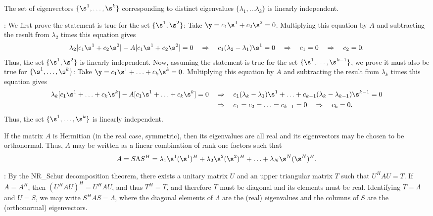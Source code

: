 \begin{fact} \label{fact.A.D.D.A}
The set of eigenvectors $\{\s^{1},\ldots,\s^{k}\}$ corresponding to
distinct eigenvalues $\{\lambda_{1},\ldots\lambda_{k}\}$ is linearly
independent.
\end{fact}

\/: We first prove the statement
is true for the set $\{\s^{1},\s^{2}\}$: Take
$\y=c_{1}\s^{1}+c_{2}\s^{2}=0$.  Multiplying this equation by $A$ and
subtracting the result from $\lambda_{2}$ times this equation gives
\begin{equation*}
    \lambda_{2}[c_{1}\s^{1}+c_{2}\s^{2}] - A[c_{1}\s^{1}+c_{2}\s^{2}] =0 \quad \Rightarrow \quad
    c_{1} (\lambda_{2}-\lambda_{1}) \s^{1} = 0 \quad \Rightarrow \quad c_{1}=0 \quad \Rightarrow \quad c_{2}=0.
\end{equation*}
Thus, the set $\{\s^{1},\s^{2}\}$ is linearly independent.  Now,
assuming the statement is true for the set
$\{\s^{1},\ldots,\s^{k-1}\}$, we prove it must also be true for
$\{\s^{1},\ldots,\s^{k}\}$: Take
$\y=c_{1}\s^{1}+\ldots+c_{k}\s^{k}=0$.  Multiplying this equation by
$A$ and subtracting the result from $\lambda_{k}$ times this equation
gives
\begin{align*}
    \lambda_{k}[c_{1}\s^{1}+\ldots+c_{k}\s^{k}] -
    A[c_{1}\s^{1}+\ldots+c_{k}\s^{k}] =0 \quad &\Rightarrow \quad c_{1}
    (\lambda_{k}-\lambda_{1}) \s^{1} + \ldots + c_{k-1}
    (\lambda_{k}-\lambda_{k-1}) \s^{k-1} = 0 \\ &\Rightarrow \quad
    c_{1}=c_{2}=\ldots=c_{k-1}=0 \quad \Rightarrow \quad c_{k}=0.
\end{align*}
Thus, the set $\{\s^{1},\ldots,\s^{k}\}$ is linearly independent. \endproof

\begin{fact} \label{fact.A.D.D.B}
If the matrix $A$ is Hermitian (in the real case,
symmetric), then its eigenvalues are all real and its eigenvectors may be
chosen to be orthonormal.  Thus, $A$ may be written as a linear combination of rank one
factors such that
\begin{equation*}
A=S\Lambda S^H = \lambda_1 \s^1 (\s^1)^H + \lambda_2 \s^2 (\s^2)^H + \ldots + \lambda_N \s^N (\s^N)^H.
\end{equation*}
\end{fact}

\/: By the NR_Schur decomposition theorem, there
exists a unitary matrix $U$ and an upper triangular matrix $T$ such
that $U^{H}AU=T$.  If $A=A^{H}$, then $(U^{H}AU)^{H}=U^{H}AU$, and
thus $T^{H}=T$, and therefore $T$ must be diagonal and its elements
must be real.  Identifying $T=\Lambda$ and $U=S$, we may write
$S^{H}A S=\Lambda$, where the diagonal elements of $\Lambda$ are the
(real) eigenvalues and the columns of $S$ are the (orthonormal)
eigenvectors.   \endproof

